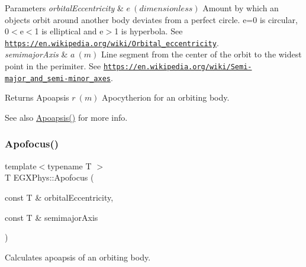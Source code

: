 \begin{DoxyParams}{Parameters}
{\em orbital\+Eccentricity} & $ e\ (dimensionless)$ Amount by which an objects orbit around another body deviates from a perfect circle. e=0 is circular, 0$<$e$<$1 is elliptical and e$>$1 is hyperbola. See \href{https://en.wikipedia.org/wiki/Orbital_eccentricity}{\tt https\+://en.\+wikipedia.\+org/wiki/\+Orbital\+\_\+eccentricity}. \\
\hline
{\em semimajor\+Axis} & $ a\ (m)$ Line segment from the center of the orbit to the widest point in the perimiter. See \href{https://en.wikipedia.org/wiki/Semi-major_and_semi-minor_axes}{\tt https\+://en.\+wikipedia.\+org/wiki/\+Semi-\/major\+\_\+and\+\_\+semi-\/minor\+\_\+axes}. \\
\hline
\end{DoxyParams}
\begin{DoxyReturn}{Returns}
Apoapsis $ r\ (m)$ Apocytherion for an orbiting body. 
\end{DoxyReturn}
\begin{DoxySeeAlso}{See also}
\mbox{\hyperlink{group___e_g_x_phys-_apoapsis_gaf962e650bf84a568458e8eb39b1c61ba}{Apoapsis()}} for more info. 
\end{DoxySeeAlso}
\mbox{\label{group___e_g_x_phys-_apoapsis_gaa53ac4e15bc6bc0fecf72eadb7a513e0}} 
\subsubsection{\texorpdfstring{Apofocus()}{Apofocus()}}
{\footnotesize\ttfamily template$<$typename T $>$ \\
T E\+G\+X\+Phys\+::\+Apofocus (\begin{DoxyParamCaption}\item[{const T \&}]{orbital\+Eccentricity,  }\item[{const T \&}]{semimajor\+Axis }\end{DoxyParamCaption})}



Calculates apoapsis of an orbiting body. 


